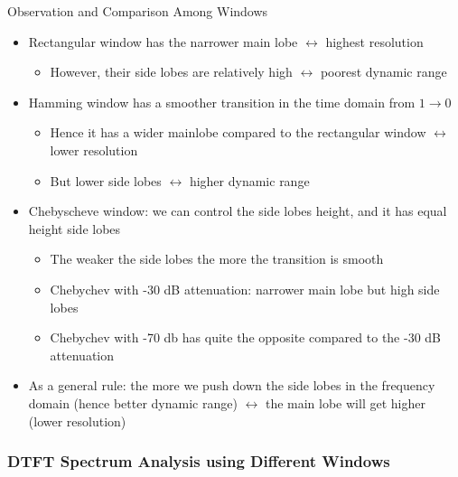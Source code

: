 \documentclass{beamer}
\begin{document}
\begin{frame}[t,allowframebreaks]{Observation and Comparison Among Windows}

\begin{itemize}

\item Rectangular window has the narrower main lobe $\leftrightarrow$ highest resolution

	\begin{itemize}
	\item However, their side lobes are relatively high $\leftrightarrow$ poorest dynamic range
	\end{itemize}

\item Hamming window has a smoother transition in the time domain from $1 \rightarrow 0$

	\begin{itemize}
	\item Hence it has a wider mainlobe compared to the rectangular window $\leftrightarrow$ lower resolution
	
	\item But lower side lobes $\leftrightarrow$ higher dynamic range
	\end{itemize}

\newpage
\item Chebyscheve window: we can control the side lobes height, and it has equal height side lobes

	\begin{itemize}
	\item The weaker the side lobes the more the transition is smooth
	
	\item Chebychev with -30 dB attenuation: narrower main lobe but high side lobes
	
	\item Chebychev with -70 db has quite the opposite compared to the -30 dB attenuation
	\end{itemize}

\item As a general rule: the more we push down the side lobes in the frequency domain (hence better dynamic range) $\leftrightarrow$ the main lobe will get higher (lower resolution)

\end{itemize}

\end{frame}


\subsubsection{DTFT Spectrum Analysis using Different Windows}
\end{document}
